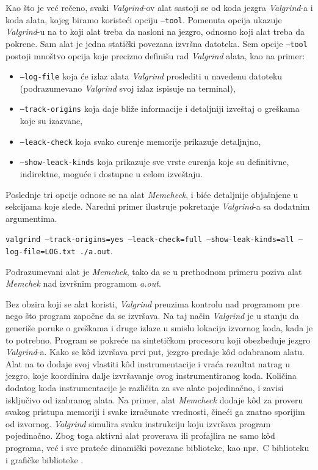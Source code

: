 \documentclass[12pt,oneside]{memoir}
\theoremstyle{plain}
\theoremstyle{definition}
\begin{document}
Kao što je već rečeno, svaki \textit{Valgrind}-ov alat sastoji se od koda jezgra \textit{Valgrind}-a i koda alata, kojeg biramo koristeći opciju \texttt{--tool}. Pomenuta opcija ukazuje \textit{Valgrind}-u na to koji alat treba da nasloni na jezgro, odnosno koji alat treba da pokrene. Sam alat je jedna statički povezana izvršna datoteka. Sem opcije \texttt{--tool} postoji mnoštvo opcija koje precizno definišu rad \textit{Valgrind} alata, kao na primer:
\begin{itemize}
\item \texttt{--log-file}  koja će izlaz alata \textit{Valgrind} proslediti u navedenu datoteku (podrazumevano \textit{Valgrind} svoj izlaz ispisuje na terminal),
\item \texttt{--track-origins} koja daje bliže informacije i detaljniji izveštaj o greškama koje su izazvane, 
\item \texttt{--leack-check} koja svako curenje memorije prikazuje detaljnjno,
\item \texttt{--show-leack-kinds} koja prikazuje sve vrste curenja koje su definitivne, indirektne, moguće i dostupne u celom izveštaju.
\end{itemize} 
Poslednje tri opcije odnose se na alat \textit{Memcheck}, i biće detaljnije objašnjene u sekcijama koje slede. Naredni primer ilustruje pokretanje \textit{Valgrind}-a sa dodatnim argumentima.
\begin{center}
\texttt{valgrind --track-origins=yes --leack-check=full --show-leak-kinds=all --log-file=LOG.txt ./a.out}.
\end{center}
Podrazumevani alat je \textit{Memchek}, tako da se u prethodnom primeru poziva alat \textit{Memchek} nad izvršnim programom \textit{a.out}.

Bez obzira koji se alat koristi, \textit{Valgrind} preuzima kontrolu nad  programom pre nego što program započne da se izvršava. Na taj način \textit{Valgrind} je u stanju da generiše poruke o greškama i druge izlaze u smislu lokacija izvornog koda, kada je to potrebno. Program se pokreće na sintetičkom procesoru koji obezbeđuje jezgro \textit{Valgrind}-a. Kako se k\^od izvršava prvi put, jezgro predaje k\^od odabranom alatu. Alat na to dodaje svoj vlastiti k\^od instrumentacije i vraća rezultat natrag u jezgro, koje koordinira dalje izvršavanje ovog instrumentiranog koda. Količina dodatog koda instrumentacije je različita za sve alate pojedinačno, i zavisi isključivo od izabranog alata. Na primer, alat \textit{Memcheck} dodaje k\^od za proveru svakog pristupa memoriji i svake izračunate vrednosti, čineći ga znatno sporijim od izvornog. \textit{Valgrind} simulira svaku instrukciju koju izvršava program pojedinačno. Zbog toga aktivni alat proverava ili profajlira ne samo k\^od programa, već i sve prateće dinamički povezane biblioteke, kao npr.~C biblioteku i grafičke biblioteke \cite{ValgrindCore}.
\end{document}
